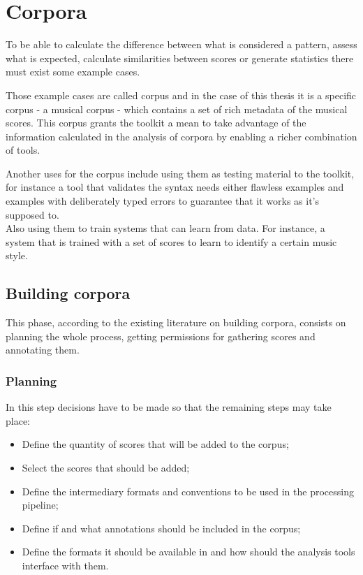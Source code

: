 \documentclass[main.tex]{files}
\begin{document}
\chapter{Corpora}

To be able to calculate the difference between what is considered a pattern, assess what is expected,
calculate similarities between scores or generate statistics there must exist some example cases.

Those example cases are called corpus and in the case of this thesis it is a specific corpus - a
musical corpus - which contains a set of rich metadata of the musical scores. This corpus grants
the toolkit a mean to take advantage of the information calculated in the analysis of corpora by
enabling a richer combination of tools.

Another uses for the corpus include using them as testing material to the toolkit, for instance a
tool that validates the syntax needs either flawless examples and examples with deliberately typed
errors to guarantee that it works as it's supposed to.\\
Also using them to train systems that can learn from data. For instance, a system that is trained
with a set of scores to learn to identify a certain music style.

\section{Building corpora}

This phase, according to the existing literature on building corpora\cite{Atkins1992,
wynne2005developing}, consists on planning the whole process, getting permissions for gathering
scores and annotating them.

\subsection{Planning}

In this step decisions have to be made so that the remaining steps may take place:
\begin{itemize}
  \item Define the quantity of scores that will be added to the corpus;
  \item Select the scores that should be added;
  \item Define the intermediary formats and conventions to be used in the processing pipeline;
  \item Define if and what annotations should be included in the corpus;
  \item Define the formats it should be available in and how should the analysis tools interface
    with them.
\end{itemize}
\end{document}
